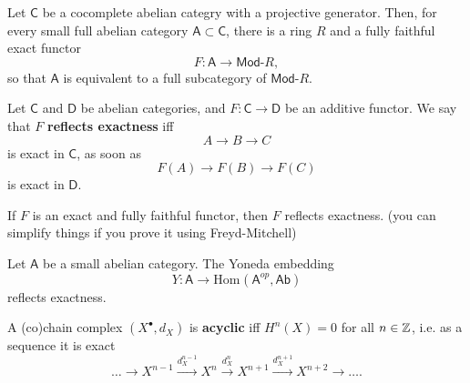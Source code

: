 \begin{thm}[]
	Let $\mathsf{C}$ be a cocomplete abelian categry with a projective generator.
	Then, for every small full abelian category $\mathsf{A} \subset \mathsf{C}$,
	there is a ring $R$ and a fully faithful exact functor
	\begin{equation}
	F: \mathsf{A} \to \mathsf{Mod}\text{-}R
	,\end{equation} 
	so that $\mathsf{A}$ is equivalent to a full subcategory of $\mathsf{Mod}\text{-}R$.
\end{thm}

\begin{defn}
	Let $\mathsf{C}$ and $\mathsf{D}$ be abelian categories, and
	$F: \mathsf{C} \to \mathsf{D}$ be an additive functor.
	We say that $F$ \textbf{reflects exactness} iff
	\begin{equation}
	A \to B \to C
	\end{equation} 
	is exact in $\mathsf{C}$, as soon as
	\begin{equation}
		F(A) \to F(B) \to F(C)
	\end{equation} 
	is exact in $\mathsf{D}$.
\end{defn}

\begin{lem}
	If $F$ is an exact and fully faithful functor,
	then $F$ reflects exactness.
	(you can simplify things if you prove it using Freyd-Mitchell)
\end{lem} 

\begin{prop}
	Let $\mathsf{A}$ be a small abelian category.
	The Yoneda embedding
	\begin{equation}
	Y: \mathsf{A} \to \mathrm{Hom}_{ }\left( \mathsf{A}^{op}, \mathsf{Ab} \right)
	\end{equation} 
	reflects exactness.
\end{prop} 

\begin{defn}
	A (co)chain complex $\left( X^{\bullet}, d_{X} \right)$ is \textbf{acyclic} iff 
	$H^n(X) = 0$ for all $n \in \mathbb{Z}$, i.e. as a sequence it is exact
	\begin{equation}
	\ldots \to X^{n-1} \xrightarrow{d_X^{n-1}} X^n \xrightarrow{d_X^n} 
	X^{n+1} \xrightarrow{d_X^{n+1}} X^{n+2} \to \ldots
	.\end{equation} 
\end{defn}
